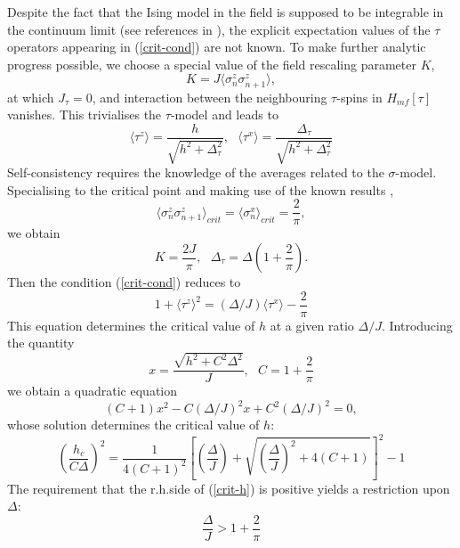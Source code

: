 Despite the fact that the Ising model
in the field is supposed to be integrable
in the continuum limit (see references in \cite{MC}),
the explicit expectation values
of the $\tau$ operators appearing in (\ref{crit-cond}) are not known.
To make further analytic progress possible, we choose
a special value of the field rescaling parameter
$K$,
\begin{equation}
K = J \langle \sigma^z _n \sigma^z _{n+1} \rangle,
\label{special-K}
\end{equation}
at which $J_{\tau} = 0$, and interaction between the neighbouring $\tau$-spins
in $H_{mf}[\tau]$ vanishes. This trivialises the $\tau$-model and leads to
\begin{equation}
\langle \tau^z \rangle = \frac{h}{\sqrt{h^2 + \Delta^2 _{\tau}}},~~~
\langle \tau^x \rangle = \frac{\Delta _{\tau}}{\sqrt{h^2 + \Delta^2 _{\tau}}}
\label{tau-averages}
\end{equation}
Self-consistency requires the knowledge of the averages related to the
$\sigma$-model. Specialising to the critical point and making use of the known
results \cite{Pf},
\begin{equation}
\langle \sigma^z _n \sigma^z _{n+1} \rangle_{crit} = \langle \sigma^x _n \rangle_{crit} = \frac{2}{\pi},
\end{equation}
we obtain
\begin{equation}
K = \frac{2 J}{\pi}, ~~~\Delta_{\tau} = \Delta \left( 1 + \frac{2}{\pi}
\right).
\end{equation}
Then the condition (\ref{crit-cond}) reduces to
\begin{equation} 
1 + \langle \tau^z \rangle^2 = (\Delta / J) \langle \tau^x \rangle - \frac{2}{\pi}
\label{eq-1.1}
\end{equation}
This equation determines the critical value of $h$ at a given ratio
$\Delta / J$.
Introducing the quantity
$$
x = \frac{\sqrt{h^2 + C^2 \Delta^2}}{J}, ~~~C = 1 + \frac{2}{\pi}
$$
we obtain a quadratic equation
$$
(C+1) x^2 - C (\Delta/J)^2 x + C^2 (\Delta/J)^2 = 0,
$$
whose solution determines the critical value of $h$:
\begin{equation}
\left(\frac{h_c}{C\Delta} \right)^2
= \frac{1}{4 (C+1)^2}
\left[\left(\frac{\Delta}{J} \right) + \sqrt{\left(\frac{\Delta}{J} \right)^2 + 4 (C+1)}\right]^2 - 1
\label{crit-h}
\end{equation}
The requirement that the r.h.side of (\ref{crit-h}) is positive yields a
restriction upon $\Delta$:
\begin{equation}
\frac{\Delta}{J} > 1 + \frac{2}{\pi} \label{restr-ising}
\end{equation}
